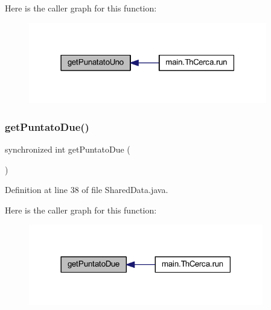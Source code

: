 Here is the caller graph for this function\+:
\nopagebreak
\begin{figure}[H]
\begin{center}
\leavevmode
\includegraphics[width=295pt]{classmain_1_1_shared_data_a61e4168cef037c5305a703af0c3e5ce5_icgraph}
\end{center}
\end{figure}
\mbox{\label{classmain_1_1_shared_data_afe476c2ad5a76e2d77871f0cfe94b1fd}} 
\subsubsection{\texorpdfstring{get\+Puntato\+Due()}{getPuntatoDue()}}
{\footnotesize\ttfamily synchronized int get\+Puntato\+Due (\begin{DoxyParamCaption}{ }\end{DoxyParamCaption})}



Definition at line 38 of file Shared\+Data.\+java.

Here is the caller graph for this function\+:
\nopagebreak
\begin{figure}[H]
\begin{center}
\leavevmode
\includegraphics[width=290pt]{classmain_1_1_shared_data_afe476c2ad5a76e2d77871f0cfe94b1fd_icgraph}
\end{center}
\end{figure}
\mbox{\label{classmain_1_1_shared_data_aa492c5b4f3fb55eb33f9c79b7b484d41}} 

